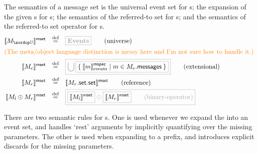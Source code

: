 \begin{definition}[\mmessageset]

  The semantics of a message set is the universal event set for \muniversemessageset s;
  the expansion of the given \mmessagespec s for \mextensionalmessageset s;
  the semantics of the referred-to set for \mrefmessageset s;
  and the semantics of the referred-to set operator for \mbinarymessageset s.
%
\begin{align*}
  \msgsetsema{\aumsgset}
  \quad\defeq\quad
  &
    \tlang{\events}
    \tag{universe}
  \\
  \intertext{\todo{The meta/object language distinction is messy here
  and I'm not sure how to handle it.}}
  \msgsetsema{\anemsgset}
  \quad\defeq\quad
  &
    \tlang{
    \bigcup
    \olang{
    \Set{
    \emspecsema{\amspec} | \amspec \in \field{\anemsgset}{messages}
    }
    }
    }
    \tag{extensional}
  \\
  \msgsetsema{\armsgset}
  \quad\defeq\quad
  &
    \msgsetsema{\field{\field{\armsgset}{set}}{set}}
    \tag{reference}
  \\
  \msgsetsema{\amsgset_l \odot \amsgset_r}
  \quad\defeq\quad
  &
  \tlang{
    \olang{\msgsetsema{\amsgset_l}}
    \odot
    \olang{\msgsetsema{\amsgset_r}}
    \tag{binary-operator}
  }
\end{align*}
\end{definition}

There are two semantic rules for \mmessagespec s.  One is used whenever
we expand the \mmessagespec{} into an event set, and handles `rest' arguments
by implicitly quantifying over the missing parameters.  The other is used when
expanding to a prefix, and introduces explicit discards for the missing
parameters.  

